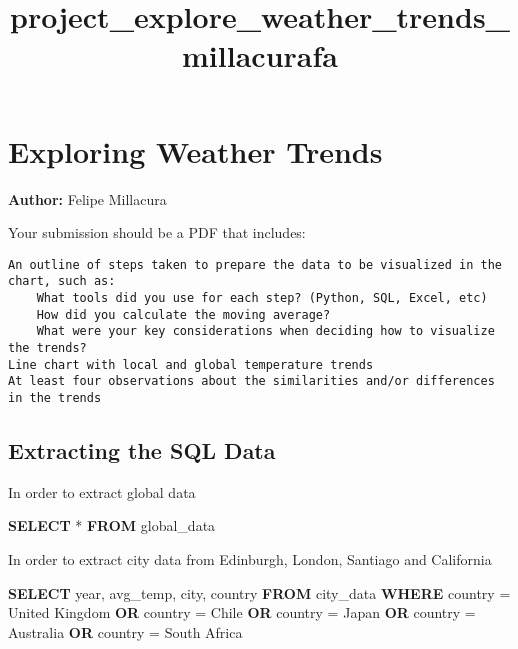 \documentclass[11pt]{article}
\title{project\_explore\_weather\_trends\_millacurafa}
\newenvironment{Shaded}{}{}
\newcommand{\KeywordTok}[1]{\textcolor[rgb]{0.00,0.44,0.13}{\textbf{{#1}}}}
\newcommand{\DataTypeTok}[1]{\textcolor[rgb]{0.56,0.13,0.00}{{#1}}}
\newcommand{\StringTok}[1]{\textcolor[rgb]{0.25,0.44,0.63}{{#1}}}
\newcommand{\NormalTok}[1]{{#1}}
\newcommand{\OperatorTok}[1]{\textcolor[rgb]{0.40,0.40,0.40}{{#1}}}
\begin{document}
    
    \maketitle
    
    

    
    \hypertarget{exploring-weather-trends}{%
\section{Exploring Weather Trends}\label{exploring-weather-trends}}

    \textbf{Author:} Felipe Millacura

    Your submission should be a PDF that includes:

\begin{verbatim}
An outline of steps taken to prepare the data to be visualized in the chart, such as:
    What tools did you use for each step? (Python, SQL, Excel, etc)
    How did you calculate the moving average?
    What were your key considerations when deciding how to visualize the trends?
Line chart with local and global temperature trends
At least four observations about the similarities and/or differences in the trends
\end{verbatim}

    \hypertarget{extracting-the-sql-data}{%
\subsection{Extracting the SQL Data}\label{extracting-the-sql-data}}

    In order to extract global data

\begin{Shaded}
\begin{Highlighting}[]

\KeywordTok{SELECT} \OperatorTok{*}
\KeywordTok{FROM}\NormalTok{ global\_data}
\end{Highlighting}
\end{Shaded}

In order to extract city data from Edinburgh, London, Santiago and
California

\begin{Shaded}
\begin{Highlighting}[]
\KeywordTok{SELECT} \DataTypeTok{year}\NormalTok{, avg\_temp, city, country}
\KeywordTok{FROM}\NormalTok{ city\_data}
\KeywordTok{WHERE}\NormalTok{ country }\OperatorTok{=} \StringTok{\textquotesingle{}United Kingdom\textquotesingle{}}
\KeywordTok{OR}\NormalTok{ country }\OperatorTok{=} \StringTok{\textquotesingle{}Chile\textquotesingle{}}
\KeywordTok{OR}\NormalTok{ country }\OperatorTok{=} \StringTok{\textquotesingle{}Japan\textquotesingle{}}
\KeywordTok{OR}\NormalTok{ country }\OperatorTok{=} \StringTok{\textquotesingle{}Australia\textquotesingle{}}
\KeywordTok{OR}\NormalTok{ country }\OperatorTok{=} \StringTok{\textquotesingle{}South Africa\textquotesingle{}}
\end{Highlighting}
\end{Shaded}
\end{document}
